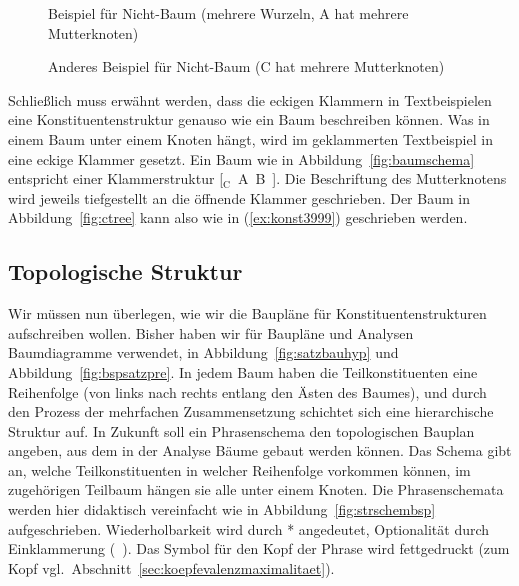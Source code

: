 \begin{figure}[!htbp]
  \centering
  \caption[Beispiel für Nicht-Baum]{Beispiel für Nicht-Baum (mehrere Wurzeln, A hat mehrere Mutterknoten)}
  \label{fig:notree1}
\end{figure}

\begin{figure}[!htbp]
  \centering
  \caption[Anderes Beispiel für Nicht-Baum]{Anderes Beispiel für Nicht-Baum (C hat mehrere Mutterknoten)}
  \label{fig:notree2}
\end{figure}

Schließlich muss erwähnt werden, dass die eckigen Klammern in Textbeispielen eine Konstituentenstruktur genauso wie ein Baum beschreiben können.
Was in einem Baum unter einem Knoten hängt, wird im geklammerten Textbeispiel in eine eckige Klammer gesetzt.
Ein Baum wie in Abbildung~\ref{fig:baumschema} entspricht einer Klammerstruktur [$_\mathrm{C}$~A~B~].
Die Beschriftung des Mutterknotens wird jeweils tiefgestellt an die öffnende Klammer geschrieben.
Der Baum in Abbildung~\ref{fig:ctree} kann also wie in (\ref{ex:konst3999}) geschrieben werden.

\begin{exe}
  \ex{\label{ex:konst3999} [$_\textrm{C}$~A~[$_\textrm{B}$~D~E~F~]~]}
\end{exe}

\subsection{Topologische Struktur}

\label{sec:topologische}

Wir müssen nun überlegen, wie wir die Baupläne für Konstituentenstrukturen aufschreiben wollen.
Bisher haben wir für Baupläne und Analysen Baumdiagramme verwendet, \zB in Abbildung~\ref{fig:satzbauhyp} und Abbildung~\ref{fig:bspsatzpre}.
In jedem Baum haben die Teilkonstituenten eine Reihenfolge (von links nach rechts entlang den Ästen des Baumes), und durch den Prozess der mehrfachen Zusammensetzung schichtet sich eine hierarchische Struktur auf.
In Zukunft soll ein Phrasenschema den topologischen Bauplan angeben, aus dem in der Analyse Bäume gebaut werden können.
Das Schema gibt an, welche Teilkonstituenten in welcher Reihenfolge vorkommen können, im zugehörigen Teilbaum hängen sie alle unter einem Knoten.
Die Phrasenschemata werden hier didaktisch vereinfacht wie in Abbildung~\ref{fig:strschembsp} aufgeschrieben.
Wiederholbarkeit wird durch * angedeutet, Optionalität durch Einklammerung (\ ).
Das Symbol für den Kopf der Phrase wird fettgedruckt (zum Kopf vgl.\ Abschnitt~\ref{sec:koepfevalenzmaximalitaet}).

